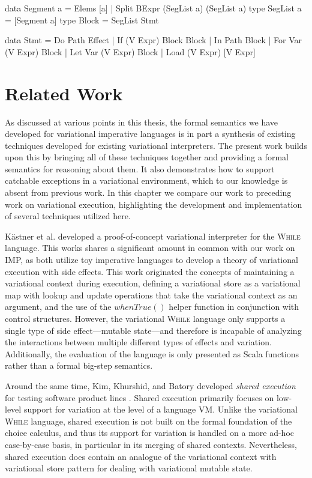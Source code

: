 \documentclass[12pt,oneside]{book}
\begin{document}
\begin{program}
data Segment a = Elems [a] | Split BExpr (SegList a) (SegList a)
type SegList a = [Segment a]
type Block = SegList Stmt

data Stmt
     = Do Path Effect
     | If (V Expr) Block Block
     | In Path Block
     | For Var (V Expr) Block
     | Let Var (V Expr) Block
     | Load (V Expr) [V Expr]
\end{program}

\chapter{Related Work}
\label{ch:rw}

As discussed at various points in this thesis, the formal semantics we have developed for variational imperative languages
is in part a synthesis of existing techniques developed for existing variational interpreters. The present work builds upon this
by bringing all of these techniques together and providing a formal semantics for reasoning about them. It also demonstrates
how to support catchable exceptions in a variational environment, which to our knowledge is absent from previous work.
In this chapter we compare our work to preceding work on variational execution, highlighting the development and implementation
of several techniques utilized here.

 K\"astner et al. \cite{varwhile} developed a proof-of-concept variational interpreter for the \textsc{While} language. This works shares a
 significant amount in common with our work on IMP, as both utilize toy imperative languages to develop a theory of variational execution
 with side effects. This work originated the concepts of maintaining a variational context during execution, defining a variational store as
 a variational map with lookup and update operations that take the variational context as an argument, and the use of the $\mathit{whenTrue}()$
 helper function in conjunction with control structures. However, the variational \textsc{While} language only supports a single type of side
 effect---mutable state---and therefore is incapable of analyzing the interactions between multiple different types of effects and variation.
 Additionally, the evaluation of the language is only presented as Scala functions rather than a formal big-step semantics.
 
 Around the same time, Kim, Khurshid, and Batory developed \emph{shared execution} for testing software product lines \cite{sharedexec}.
 Shared execution primarily focuses on low-level support for variation at the level of a language VM.
 Unlike the variational \textsc{While} language, shared execution is not built on the formal foundation of the choice calculus, and thus its
 support for variation is handled on a more ad-hoc case-by-case basis, in particular in its merging of shared contexts. Nevertheless,
 shared execution does contain an analogue of the variational context with variational store pattern for dealing with variational mutable state.
 
\end{document}
